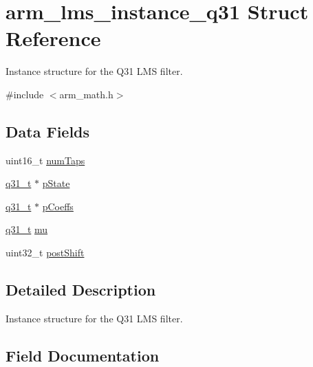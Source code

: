 \hypertarget{structarm__lms__instance__q31}{}\section{arm\+\_\+lms\+\_\+instance\+\_\+q31 Struct Reference}
\label{structarm__lms__instance__q31}


Instance structure for the Q31 L\+MS filter.  




{\ttfamily \#include $<$arm\+\_\+math.\+h$>$}

\subsection*{Data Fields}
\begin{DoxyCompactItemize}
\item 
uint16\+\_\+t \mbox{\hyperlink{structarm__lms__instance__q31_a751941891e47f522a7f5375fe8990aac}{num\+Taps}}
\item 
\mbox{\hyperlink{arm__math_8h_adc89a3547f5324b7b3b95adec3806bc0}{q31\+\_\+t}} $\ast$ \mbox{\hyperlink{structarm__lms__instance__q31_adee4ba3ee8869865af7d8fa08ca913d6}{p\+State}}
\item 
\mbox{\hyperlink{arm__math_8h_adc89a3547f5324b7b3b95adec3806bc0}{q31\+\_\+t}} $\ast$ \mbox{\hyperlink{structarm__lms__instance__q31_a68888e36167d81cb7836db10367a1682}{p\+Coeffs}}
\item 
\mbox{\hyperlink{arm__math_8h_adc89a3547f5324b7b3b95adec3806bc0}{q31\+\_\+t}} \mbox{\hyperlink{structarm__lms__instance__q31_a21ab4237a726ea7751f5026d89d2e577}{mu}}
\item 
uint32\+\_\+t \mbox{\hyperlink{structarm__lms__instance__q31_aa2cacddfc5e1d86905d7d31a18b1979b}{post\+Shift}}
\end{DoxyCompactItemize}


\subsection{Detailed Description}
Instance structure for the Q31 L\+MS filter. 

\subsection{Field Documentation}
\mbox{\label{structarm__lms__instance__q31_a21ab4237a726ea7751f5026d89d2e577}} 
